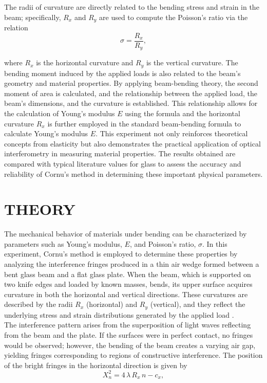 \documentclass[a4paper,11pt]{article}
\begin{document}
The radii of curvature are directly related to the bending stress and strain in the beam; specifically, \(R_x\) and \(R_y\) are used to compute the Poisson's ratio via the relation 
\begin{equation}
\sigma = \frac{R_x}{R_y},
\end{equation}

where \(R_x\) is the horizontal curvature and \(R_y\) is the vertical curvature. The bending moment induced by the applied loads is also related to the beam's geometry and material properties. By applying beam-bending theory, the second moment of area is calculated, and the relationship between the applied load, the beam's dimensions, and the curvature is established. This relationship allows for the calculation of Young's modulus \(E\) using the formula
and the horizontal curvature \(R_x\) is further employed in the standard beam-bending formula to calculate Young's modulus \(E\). This experiment not only reinforces theoretical concepts from elasticity but also demonstrates the practical application of optical interferometry in measuring material properties. The results obtained are compared with typical literature values for glass to assess the accuracy and reliability of Cornu's method in determining these important physical parameters.

\newpage
\section{\centering THEORY}
\label{sec:THEORY}
\indent

The mechanical behavior of materials under bending can be characterized by parameters such as Young's modulus, \(E\), and Poisson's ratio, \(\sigma\). In this experiment, Cornu's method is employed to determine these properties by analyzing the interference fringes produced in a thin air wedge formed between a bent glass beam and a flat glass plate. When the beam, which is supported on two knife edges and loaded by known masses, bends, its upper surface acquires curvature in both the horizontal and vertical directions. These curvatures are described by the radii \(R_x\) (horizontal) and \(R_y\) (vertical), and they reflect the underlying stress and strain distributions generated by the applied load \autocite{USMYoungPoisson}.\\

The interference pattern arises from the superposition of light waves reflecting from the beam and the plate. If the surfaces were in perfect contact, no fringes would be observed; however, the bending of the beam creates a varying air gap, yielding fringes corresponding to regions of constructive interference. The position of the bright fringes in the horizontal direction is given by
\begin{equation}
X_n^2 = 4 \, \lambda \, R_x \, n - c_x,
\end{equation}
\end{document}
